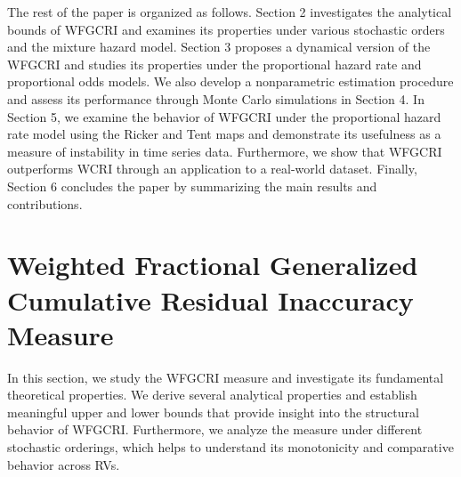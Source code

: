 \documentclass[12pt,a4paper]{article}
\numberwithin{equation}{section}
\begin{document}
The rest of the paper is organized as follows. Section 2 investigates the analytical bounds of WFGCRI and examines its properties under various stochastic orders and the mixture hazard model.
Section 3 proposes a dynamical version of the WFGCRI and studies its properties under the proportional hazard rate and proportional odds models. We also develop a nonparametric estimation procedure and assess its performance through Monte Carlo simulations in Section 4.
In Section 5, we examine the behavior of WFGCRI under the proportional hazard rate model using the Ricker and Tent maps and demonstrate its usefulness as a measure of instability in time series data. Furthermore, we show that WFGCRI outperforms WCRI through an application to a real-world dataset. Finally, Section 6 concludes the paper by summarizing the main results and contributions.
	\section{Weighted Fractional Generalized Cumulative Residual Inaccuracy Measure}
	In this section, we study the WFGCRI measure and investigate its fundamental theoretical properties. We derive several analytical properties and establish meaningful upper and lower bounds that provide insight into the structural behavior of WFGCRI. Furthermore, we analyze the measure under different stochastic orderings, which helps to understand its monotonicity and comparative behavior across RVs.
	
\end{document}
